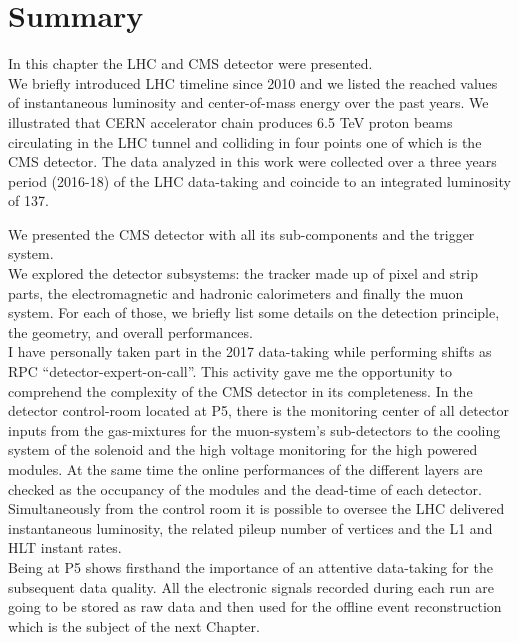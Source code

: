 \clearpage
\section{Summary}\label{sec:summaryC2}

In this chapter the LHC and CMS detector were presented.\\
We briefly introduced LHC timeline since 2010 and we listed the
reached values of instantaneous luminosity and center-of-mass energy
over the past years.
We illustrated that CERN accelerator chain produces
6.5 TeV proton beams circulating in the LHC tunnel and colliding in
four points one of which is the CMS detector. The data analyzed in
this work were collected over a three years period (2016-18) of the
LHC data-taking and coincide to an integrated luminosity of
137\fbinv.

We presented the CMS detector with all its sub-components and the
trigger system.\\
We explored the detector subsystems: the tracker made up of pixel and
strip parts, the electromagnetic
and hadronic calorimeters and finally the muon system. For each of
those, we briefly list some details on the detection principle,
the geometry, and overall performances. \\

I have personally taken part in the 2017 data-taking while performing
shifts as RPC ``detector-expert-on-call''. This activity gave me the
opportunity to comprehend the complexity of the CMS detector in its
completeness. In the detector control-room located at P5, there is the
monitoring center of all detector inputs from the gas-mixtures
for the muon-system's sub-detectors to the cooling system of the
solenoid and the high voltage monitoring for the high powered
modules. At the same time the online performances of the different layers
are checked as the occupancy of the modules and the dead-time of each
detector. Simultaneously from the control room it is possible to oversee the LHC
delivered instantaneous luminosity, the related pileup number of
vertices and the L1 and HLT instant rates. \\
Being at P5 shows firsthand the importance of an attentive
data-taking for the subsequent data quality. All the electronic
signals recorded during each run are going to be stored as raw data
and then used for the offline event
reconstruction which is the subject of the next Chapter.